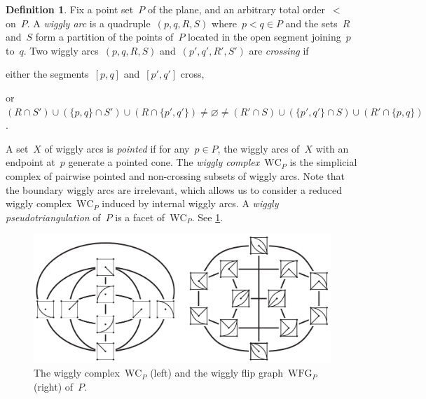 \documentclass[submission]{FPSAC2025}
\theoremstyle{definition}
\newtheorem{definition}[theorem]{Definition}
\newcommand{\darkblue}{\color{darkblue}} %
\newcommand{\defn}[1]{\textsl{\darkblue #1}} %
\newcommand{\wigglyComplex}{\mathrm{WC}} %
\newcommand{\wigglyFlipGraph}{\mathrm{WFG}} %
\begin{document}
\begin{definition}
\label{def:wigglyComplexPointSet}
Fix a point set~$P$ of the plane, and an arbitrary total order~$<$ on~$P$.
A \defn{wiggly arc} is a quadruple~$(p,q,R,S)$ where~$p < q \in P$ and the sets~$R$ and~$S$ form a partition of the points of~$P$ located in the open segment joining~$p$ to~$q$.
Two wiggly arcs~$(p,q,R,S)$ and~$(p',q',R',S')$ are \defn{crossing} if 
\begin{compactitem}
\item either the segments~$[p,q]$ and~$[p',q']$ cross, 
\item or~$(R \!\cap\! S') \cup (\{p,q\} \!\cap\! S') \cup (R \!\cap\! \{p',q'\}) \ne \varnothing \ne (R' \!\cap\! S) \cup (\{p',q'\} \!\cap\! S) \cup (R' \!\cap\! \{p,q\})$.
\end{compactitem}
A set~$X$ of wiggly arcs is \defn{pointed} if for any~$p \in P$, the wiggly arcs of~$X$ with an endpoint at~$p$ generate a pointed cone.
The \defn{wiggly complex}~$\wigglyComplex_P$ is the simplicial complex of pairwise pointed and non-crossing subsets of wiggly arcs.
Note that the boundary wiggly arcs are irrelevant, which allows us to consider a reduced wiggly complex~$\wigglyComplex_P$ induced by internal wiggly arcs.
A \defn{wiggly pseudotriangulation} of~$P$ is a facet of~$\wigglyComplex_P$.
See \cref{fig:wigglyComplexSquarre}.
%
\begin{figure}[!h]
\centerline{\includegraphics[scale=.95]{wigglyComplexSquare}}
\caption{The wiggly complex~$\wigglyComplex_P$ (left) and the wiggly flip graph~$\wigglyFlipGraph_P$ (right) of~$P$.}
\label{fig:wigglyComplexSquarre}
\end{figure}
\end{definition}

\end{document}
